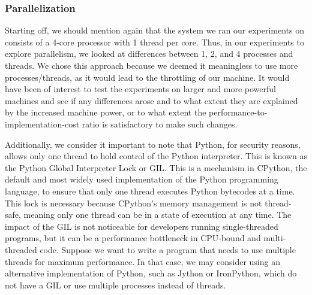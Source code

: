 \subsubsection{Parallelization}

Starting off, we should mention again that the system we ran our experiments on consists of a 4-core processor with 1 thread per core. 
Thus, in our experiments to explore parallelism, we looked at differences between 1, 2, and 4 processes and threads. 
We chose this approach because we deemed it meaningless to use more processes/threads, as it would lead to the throttling of our machine. 
It would have been of interest to test the experiments on larger and more powerful machines and see if any differences arose 
and to what extent they are explained by the increased machine power, or to what extent the performance-to-implementation-cost ratio is satisfactory 
to make such changes.

Additionally, we consider it important to note that Python, for security reasons, allows only one thread to hold control of the Python interpreter. 
This is known as the Python Global Interpreter Lock or GIL. This is a mechanism in CPython, the default and most widely used implementation of the 
Python programming language, to ensure that only one thread executes Python bytecodes at a time. 
This lock is necessary because CPython's memory management is not thread-safe, meaning only one thread can be in a state of execution at any time. 
The impact of the GIL is not noticeable for developers running single-threaded programs, 
but it can be a performance bottleneck in CPU-bound and multi-threaded code. Suppose we want to write a program that needs to use multiple threads 
for maximum performance. In that case, we may consider using an alternative implementation of Python, such as Jython or IronPython, 
which do not have a GIL or use multiple processes instead of threads.


